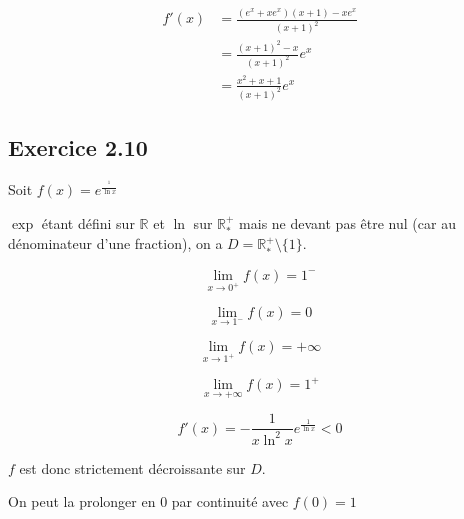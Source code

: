 \documentclass[a4paper,10pt]{report}
\begin{document}
\begin{equation*}
	\begin{split}
		f'(x) &= \frac{(e^x + x e^x)(x+1)-x e^x}{(x+1)^2} \\
		      &= \frac{(x+1)^2-x}{(x+1)^2}e^x \\
		      &= \frac{x^2 + x + 1}{(x+1)^2}e^x
	\end{split}
\end{equation*}

\subsection*{Exercice 2.10}

Soit $f(x) = e^\frac{^1}{\ln x}$

$\exp$ étant défini sur $\mathbb{R}$ et $\ln$ sur $\mathbb{R}^{+}_{*}$ mais ne devant pas être nul (car au dénominateur d'une
fraction), on a $D = \mathbb{R}^{+}_{*}\setminus\{1\}$.

\begin{displaymath}
	\lim_{x \rightarrow 0^{+}} f(x) = 1^{-}
\end{displaymath}

\begin{displaymath}
	\lim_{x \rightarrow 1^{-}} f(x) = 0
\end{displaymath}

\begin{displaymath}
	\lim_{x \rightarrow 1^{+}} f(x) = +\infty
\end{displaymath}

\begin{displaymath}
	\lim_{x \rightarrow +\infty} f(x) = 1^{+}
\end{displaymath}

\begin{displaymath}
	f'(x) =-\frac{1}{x\ln^2 x} e^{\frac{1}{\ln x}} < 0
\end{displaymath}

$f$ est donc strictement décroissante sur $D$.


On peut la prolonger en $0$ par continuité avec $f(0) = 1$


\end{document}
